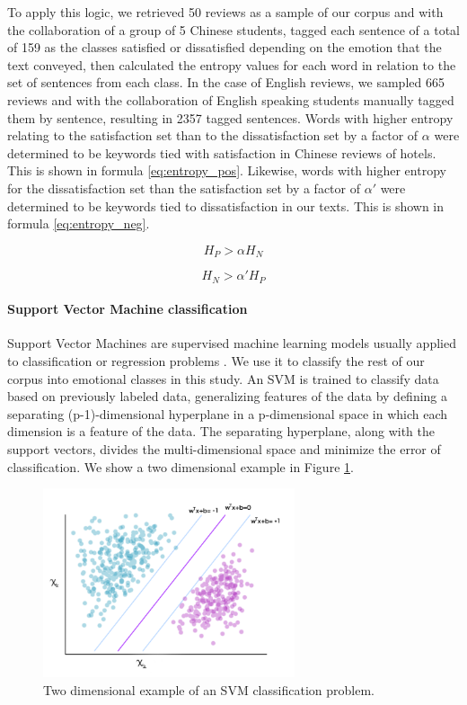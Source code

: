 \documentclass[review]{elsarticle}
\newcommand{\myparagraph}[1]{\paragraph{#1}\mbox{}\smallskip}
\begin{document}
To apply this logic, we retrieved 50 reviews as a sample of our corpus and with the collaboration of a group of 5 Chinese students, tagged each sentence of a total of 159 as the classes satisfied or dissatisfied depending on the emotion that the text conveyed, then calculated the entropy values for each word in relation to the set of sentences from each class. In the case of English reviews, we sampled 665 reviews and with the collaboration of English speaking students manually tagged them by sentence, resulting in 2357 tagged sentences. Words with higher entropy relating to the satisfaction set than to the dissatisfaction set by a factor of \(\alpha\) were determined to be keywords tied with satisfaction in Chinese reviews of hotels. This is shown in formula \ref{eq:entropy_pos}. Likewise, words with higher entropy for the dissatisfaction set than the satisfaction set by a factor of \(\alpha'\) were determined to be keywords tied to dissatisfaction in our texts. This is shown in formula \ref{eq:entropy_neg}.

\begin{equation}\label{eq:entropy_pos}
H_{P} > \alpha H_{N} %
\end{equation}

\begin{equation}\label{eq:entropy_neg}
H_{N} > \alpha' H_{P} %
\end{equation}

\myparagraph{Support Vector Machine classification}\label{svm}

Support Vector Machines are supervised machine learning models usually applied to classification or regression problems \cite[][]{cortes1995}. We use it to classify the rest of our corpus into emotional classes in this study. An SVM is trained to classify data based on previously labeled data, generalizing features of the data by defining a separating (p-1)-dimensional hyperplane in a p-dimensional space in which each dimension is a feature of the data. The separating hyperplane, along with the support vectors, divides the multi-dimensional space and minimize the error of classification. We show a two dimensional example in Figure \ref{fig:svm2d}.

\begin{figure}[bp]
\centering
\includegraphics[width=20em]{SVM_2d_example.png}
\caption{Two dimensional example of an SVM classification problem.}
\label{fig:svm2d}
\end{figure}
\end{document}
